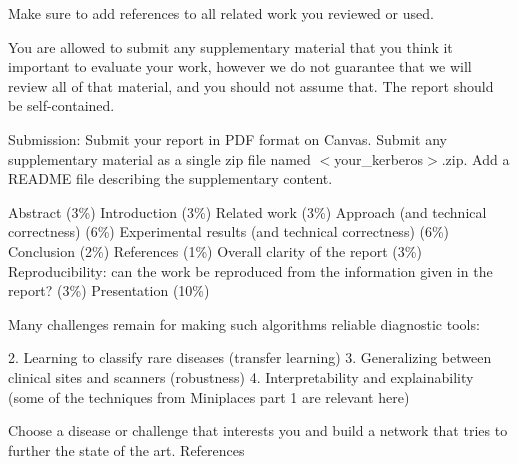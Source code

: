 \documentclass[10pt,twocolumn,letterpaper]{article}
\begin{document}
Make sure to add references to all related work you reviewed or used.

You are allowed to submit any supplementary material that you think it important to evaluate your work, however we do not guarantee that we will review all of that material, and you should not assume that. The report should be self-contained.

Submission: Submit your report in PDF format on Canvas. Submit any supplementary material as a single zip file named $<$your\_kerberos$>$.zip. Add a README file describing the supplementary content.

Abstract (3\%)
Introduction (3\%)
Related work (3\%)
Approach (and technical correctness) (6\%)
Experimental results (and technical correctness) (6\%)
Conclusion (2\%)
References (1\%)
Overall clarity of the report (3\%)
Reproducibility: can the work be reproduced from the information given in the report? (3\%)
Presentation (10\%)

Many challenges remain for making such algorithms reliable diagnostic
tools:

2. Learning to classify rare diseases (transfer learning)
3. Generalizing between clinical sites and scanners (robustness)
4. Interpretability and explainability (some of the techniques from Miniplaces part 1 are relevant
here)

Choose a disease or challenge that interests you and build a network that tries to further the
state of the art.
References



{\small


}
\end{document}
